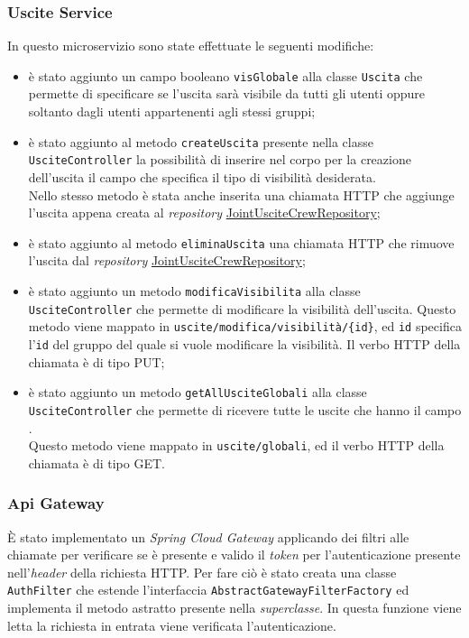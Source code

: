 \subsubsection{Uscite Service}
In questo \gls{microservizio} sono state effettuate le seguenti modifiche:
\begin{itemize}
    \item è stato aggiunto un campo booleano \texttt{visGlobale} alla classe
          \texttt{Uscita} che permette di specificare se l'uscita sarà visibile
          da tutti
          gli utenti oppure soltanto dagli utenti appartenenti agli stessi
          gruppi;
    \item è stato aggiunto al metodo \texttt{createUscita} presente nella
          classe \texttt{UsciteController} la possibilità di inserire nel corpo
          per la
          creazione dell'uscita il campo che specifica il tipo di visibilità
          desiderata.
          \\
          Nello stesso metodo è stata anche inserita una chiamata HTTP che
          aggiunge
          l'uscita appena creata al \textit{repository}
          \hyperref[JointUsciteCrewRepository]{JointUsciteCrewRepository};
    \item è stato aggiunto al metodo \texttt{eliminaUscita} una chiamata HTTP
          che rimuove l'uscita dal \textit{repository}
          \hyperref[JointUsciteCrewRepository]{JointUsciteCrewRepository};
    \item è stato aggiunto un metodo \texttt{modificaVisibilita}  alla classe
          \texttt{UsciteController} che permette di modificare la visibilità
          dell'uscita.
          Questo metodo viene mappato in
          \texttt{uscite/modifica/visibilità/\{id\}},
          ed \texttt{id} specifica l'\texttt{id} del gruppo del quale si vuole
          modificare
          la visibilità. Il verbo HTTP della chiamata è di tipo PUT;
    \item è stato aggiunto un metodo \texttt{getAllUsciteGlobali}  alla classe
          \texttt{UsciteController} che permette di ricevere tutte le uscite
          che hanno il
          campo . \\
          Questo metodo viene mappato in \texttt{uscite/globali}, ed il verbo
          HTTP
          della chiamata è di tipo GET.
\end{itemize}

\subsubsection{Api Gateway}
È stato implementato un \textit{Spring Cloud Gateway} applicando dei filtri
alle chiamate per verificare se è presente e valido il \textit{token} per
l'autenticazione  presente nell'\textit{header} della richiesta HTTP.
Per fare ciò è stato creata una classe \texttt{AuthFilter} che estende
l'interfaccia \texttt{AbstractGatewayFilterFactory} ed implementa il metodo
astratto  presente nella
\textit{superclasse}. In questa funzione viene letta la richiesta in entrata
viene verificata l'autenticazione.

